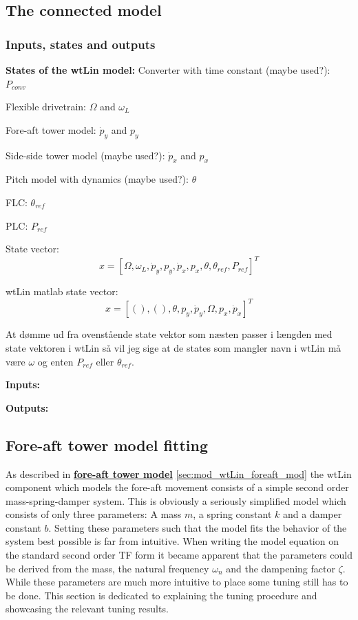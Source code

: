 %	

\subsection{The connected model}

\subsubsection{Inputs, states and outputs}
\textbf{States of the wtLin model:}
Converter with time constant (maybe used?): $ P_{conv} $

Flexible drivetrain: $ \Omega $ and $ \omega_L $

Fore-aft tower model: $ \dot{p}_y $ and $ p_y $

Side-side tower model (maybe used?): $ \dot{p}_x $ and $ p_x $

Pitch model with dynamics (maybe used?): $ \theta $

FLC: $ \theta_{ref} $

PLC: $ P_{ref} $

State vector: 
\begin{equation}\label{key}
	x = [\Omega, \omega_L, \dot{p}_y, p_y, \dot{p}_x, p_x, \theta, \theta_{ref}, P_{ref}]^T
\end{equation}

wtLin matlab state vector:
\begin{equation}\label{key}
	x = [(), (), \theta, p_y, \dot{p}_y, \Omega, p_x, \dot{p}_x]^T
\end{equation}

At dømme ud fra ovenstående state vektor som næsten passer i længden med state vektoren i wtLin så vil jeg sige at de states som mangler navn i wtLin må være $ \omega $ og enten $ P_{ref} $ eller $ \theta_{ref} $.

\textbf{Inputs:}


\textbf{Outputs:}

\subsection{Fore-aft tower model fitting} \label{sec:mod_foreaft_fitting}
As described in \hyperref[sec:mod_wtLin_foreaft_mod]{\textbf{fore-aft tower model}} \cref{sec:mod_wtLin_foreaft_mod} the wtLin component which models the fore-aft movement consists of a simple second order mass-spring-damper system. This is obviously a seriously simplified model which consists of only three parameters: A mass $ m $, a spring constant $ k $ and a damper constant $ b $. Setting these parameters such that the model fits the behavior of the system best possible is far from intuitive. When writing the model equation on the standard second order TF form it became apparent that the parameters could be derived from the mass, the natural frequency $ \omega_n $ and the dampening factor $ \zeta $. While these parameters are much more intuitive to place some tuning still has to be done. This section is dedicated to explaining the tuning procedure and showcasing the relevant tuning results.\\

